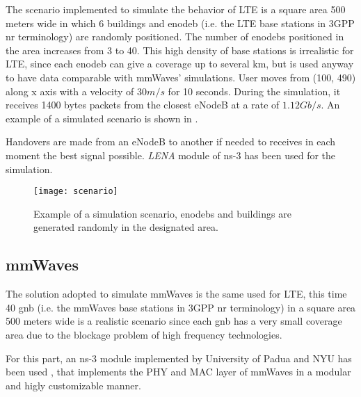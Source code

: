 The scenario implemented to simulate the behavior of LTE is a square area 500 meters wide in which 6 buildings and \gls{enodeb} (i.e. the LTE base stations in 3GPP \gls{nr} terminology) are randomly positioned.
The number of \gls{enodeb}s positioned in the area increases from 3 to 40. This high density of base stations is irrealistic for LTE, since each \gls{enodeb} can give a coverage up to several km, but is used anyway to have data comparable with \gls{mmWaves}' simulations.
User moves from (100, 490) along x axis with a velocity of $30m/s$ for 10 seconds. During the simulation, it receives 1400 bytes packets from the closest eNodeB at a rate of $1.12 Gb/s$.
An example of a simulated scenario is shown in .

Handovers are made from an eNodeB to another if needed to receives in each moment the best signal possible. \textit{LENA} module of ns-3 has been used for the simulation.

\begin{figure}[ht]
\vspace{-0.2in}
  \texttt{[image: scenario]}
  \caption{Example of a simulation scenario, \gls{enodeb}s and buildings are generated randomly in the designated area.}
  \label{fig:scenario}
\end{figure}

\subsection{mmWaves}
The solution adopted to simulate \gls{mmWaves} is the same used for LTE, this time 40 \gls{gnb} (i.e. the mmWaves base stations in 3GPP \gls{nr} terminology) in a square area 500 meters wide is a realistic scenario since each \gls{gnb} has a very small coverage area due to the blockage problem of high frequency technologies.

For this part, an ns-3 module implemented by University of Padua and NYU has been used \cite{Mezzavilla18}, that implements the PHY and MAC layer of mmWaves in a modular and higly customizable manner.